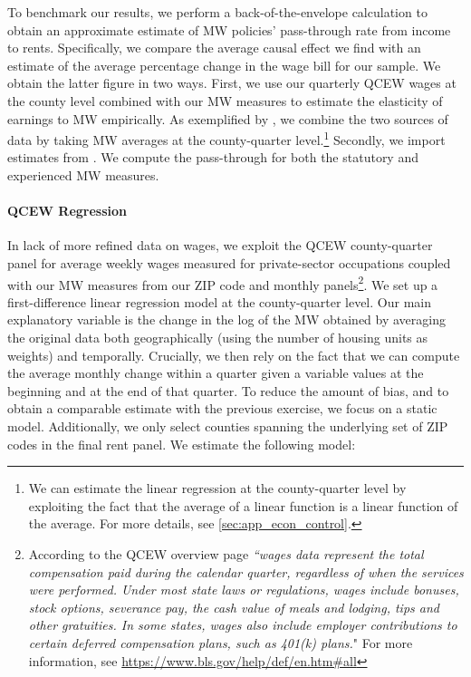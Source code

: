 To benchmark our results, we perform a back-of-the-envelope calculation to obtain an 
approximate estimate of MW policies' pass-through rate from income to rents. Specifically, 
we compare the average causal effect we find with an estimate of the average percentage 
change in the wage bill for our sample. We obtain the latter figure in two ways. First, we 
use our quarterly QCEW wages at the county level combined with our MW measures 
to estimate the elasticity of earnings to MW empirically. As exemplified by 
\textcite{gentzkow2015newspapers}, we combine the two sources of data by taking MW averages 
at the county-quarter level.\footnote{We can estimate the linear regression at the 
	county-quarter level by exploiting the fact that the average of a linear function is a 
	linear function of the average. For more details, see \autoref{sec:app_econ_control}.} 
Secondly, we import estimates from \textcite{CegnizEtAl2019}. We compute the pass-through for
both the statutory and experienced MW measures.


\paragraph{QCEW Regression} In lack of more refined data on wages, we exploit the QCEW 
county-quarter panel for average weekly wages measured for private-sector occupations coupled 
with our MW measures from our ZIP code and monthly panels\footnote{According to the QCEW overview page 
	\textit{``wages data represent 
	the total compensation paid during the calendar quarter, regardless of when the services were 
	performed. Under most state laws or regulations, wages include bonuses, stock options, severance 
	pay, the cash value of meals and lodging, tips and other gratuities. In some states, wages also 
	include employer contributions to certain deferred compensation plans, such as 401(k) plans.}" For more information, see \href{https://www.bls.gov/help/def/en.htm\#all}{https://www.bls.gov/help/def/en.htm\#all}}. We set up a first-difference linear 
regression model at the county-quarter level. Our main explanatory variable is the change in 
the log of the MW obtained by averaging the original data both geographically (using the number 
of housing units as weights) and temporally. Crucially, we then rely on the fact that we can 
compute the average monthly change within a quarter given a variable values at the beginning 
and at the end of that quarter. To reduce the amount of bias, and to obtain a comparable 
estimate with the previous exercise, we focus on a static model. Additionally, we only 
select counties spanning the underlying set of ZIP codes in the final rent panel. We estimate 
the following model:

